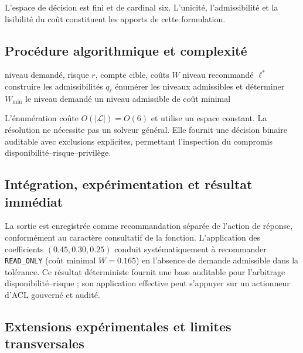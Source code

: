 \documentclass[11pt,a4paper,oneside]{report}
\theoremstyle{definition}
\theoremstyle{plain}
\begin{document}
L'espace de décision est fini et de cardinal six. L'unicité, l'admissibilité et
la lisibilité du coût constituent les apports de cette formulation.

\subsection*{Procédure algorithmique et complexité}

\begin{algorithm}[H]
\caption{Recommandation consultative de privilège}
\label{alg:ai-ro-privilege}
\begin{algorithmic}[1]
\Require niveau demandé, risque $r$, compte cible, coûts $W$
\Ensure niveau recommandé $\ell^*$
\State construire les admissibilités $q_\ell$
\State énumérer les niveaux admissibles et déterminer $W_{\min}$
  \State \Return le niveau demandé
\Else
  \State \Return un niveau admissible de coût minimal
\EndIf
\end{algorithmic}
\end{algorithm}

L'énumération coûte $O(|\mathcal{L}|)=O(6)$ et utilise un espace constant. La
résolution ne nécessite pas un solveur général. Elle fournit une décision binaire
auditable avec exclusions explicites, permettant l'inspection du compromis
disponibilité--risque--privilège.

\subsection*{Intégration, expérimentation et résultat immédiat}

La sortie est enregistrée comme recommandation séparée de l'action de réponse,
conformément au caractère consultatif de la fonction. L'application des
coefficients $(0.45,0.30,0.25)$ conduit systématiquement à recommander
\texttt{READ\_ONLY} (coût minimal $W=0.165$) en l'absence de demande admissible
dans la tolérance. Ce résultat déterministe fournit une base auditable pour
l'arbitrage disponibilité--risque ; son application effective peut s'appuyer
sur un actionneur d'ACL gouverné et audité.

\subsection{Extensions expérimentales et limites transversales}
\label{sec:ai-ro-extensions}
\end{document}
